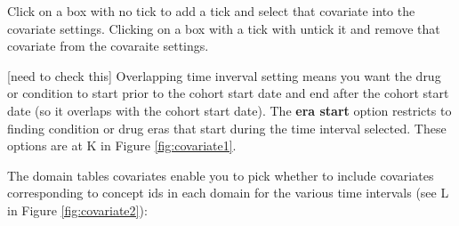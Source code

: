 \documentclass[11pt]{book}
\theoremstyle{definition}
\theoremstyle{definition}
\theoremstyle{definition}
\theoremstyle{remark}
\begin{document}
Click on a box with no tick to add a tick and select that covariate into the covariate settings. Clicking on a box with a tick with untick it and remove that covariate from the covaraite settings.

{[}need to check this{]} Overlapping time inverval setting means you want the drug or condition to start prior to the cohort start date and end after the cohort start date (so it overlaps with the cohort start date). The \textbf{era start} option restricts to finding condition or drug eras that start during the time interval selected. These options are at K in Figure \ref{fig:covariate1}.

The domain tables covariates enable you to pick whether to include covariates corresponding to concept ids in each domain for the various time intervals (see L in Figure \ref{fig:covariate2}):
\end{document}
